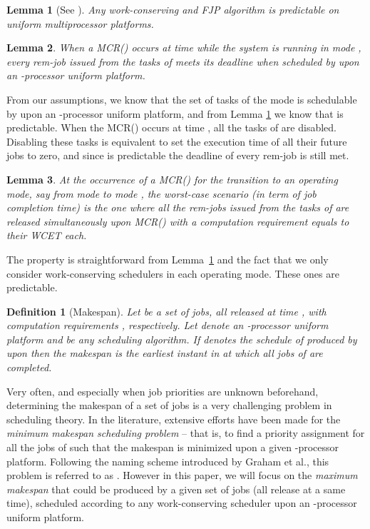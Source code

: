 \documentclass[10pt,english,a4paper]{article}
\newtheorem{lemma}{Lemma}
\newtheorem{definition}{\bf Definition}
\newenvironment{proof}[1][Proof]{\begin{trivlist}
\item[\hskip \labelsep {\bfseries #1}]}{\end{trivlist}}
\newtheorem{validity test}{Validity Test}
\newcommand{\fin}{\hfill{\small }}     \newcommand{\oh}[1]{\ensuremath{\mathcal{0}{(#1)}}} \def\thefootnote{\arabic{footnote}}
\begin{document}
\begin{lemma}[See \cite{CucuJo4}]\label{predict} 
Any work-conserving and FJP algorithm is predictable on uniform multiprocessor platforms. 
\end{lemma}

\begin{lemma}\label{rem-deadlines}
When a MCR() occurs at time  while the system is running in mode , every rem-job issued from the tasks of  meets its deadline when scheduled by  upon an -processor uniform platform.
\end{lemma}
\begin{proof}
From our assumptions, we know that the set of tasks  of the mode  is schedulable by  upon an -processor uniform platform, and from Lemma \ref{predict} we know that  is predictable. When the MCR() occurs at time , all the tasks of  are disabled. Disabling these tasks is equivalent to set the execution time of all their future jobs to zero, and since  is predictable the deadline of every rem-job is still met. \fin
\end{proof}

\begin{lemma}\label{worst-case scenario}
At the occurrence of a MCR() for the transition to an operating mode, say from mode  to mode , the {\em worst-case scenario} (in term of job completion time) is the one where all the rem-jobs issued from the tasks of  are released simultaneously upon MCR() with a computation requirement equals to their WCET each. 
\end{lemma}

\begin{proof}
The property is straightforward from Lemma~\ref{predict} and the fact that we only consider work-conserving schedulers in each operating mode. These ones are predictable. \fin
\end{proof}

\begin{definition}[Makespan]
Let  be a set of  jobs, all released at time , with computation requirements , respectively. Let  denote an -processor uniform platform and  be any scheduling algorithm. If  denotes the schedule of  produced by  upon  then the {\em makespan} is the earliest instant in  at which all jobs of  are completed.
\end{definition}

Very often, and especially when job priorities are unknown beforehand, determining the makespan of a set of jobs is a very challenging problem in scheduling theory. In the literature, extensive efforts have been made for the {\em minimum makespan scheduling problem} -- that is, to find a priority assignment for all the jobs of  such that the makespan is minimized upon a given -processor platform. Following the naming scheme introduced by Graham et al.\cite{GLLR1}, this problem is referred to as . However in this paper, we will focus on the {\em maximum makespan} that could be produced by a given set of  jobs (all release at a same time), scheduled according to any work-conserving scheduler upon an -processor uniform platform. 
\end{document}
